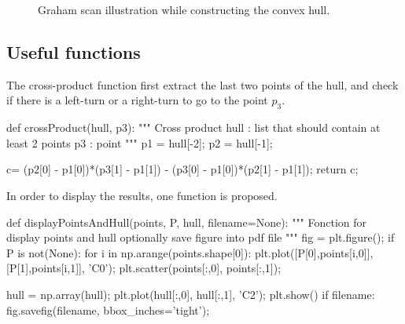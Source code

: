 \begin{figure}[H]
 \centering\caption{Graham scan illustration while constructing the convex hull.}%
 \hfill
 \hfill
 \label{fig:python:convexhull:pause}%
 \vspace*{-10pt}%
\end{figure}

\subsection{Useful functions}

The cross-product function first extract the last two points of the hull, and check if there is a left-turn or a right-turn to go to the point $p_3$.
\begin{python}
def crossProduct(hull, p3):
    """
    Cross product
    hull : list that should contain at least 2 points
    p3   : point
    """
    p1 = hull[-2];
    p2 = hull[-1];
    
    c= (p2[0] - p1[0])*(p3[1] - p1[1]) - (p3[0] - p1[0])*(p2[1] - p1[1]);
    return c;
\end{python}

In order to display the results, one function is proposed.
\begin{python}
def displayPointsAndHull(points, P, hull, filename=None):
    """
    Fonction for display points and hull
    optionally save figure into pdf file
    """
    fig = plt.figure();
    if P is not(None):
        for i in np.arange(points.shape[0]):
            plt.plot([P[0],points[i,0]], [P[1],points[i,1]], 'C0');
    plt.scatter(points[:,0], points[:,1]);
    
    hull = np.array(hull);
    plt.plot(hull[:,0], hull[:,1], 'C2');
    plt.show()
    if filename:
        fig.savefig(filename, bbox_inches='tight');
\end{python}


